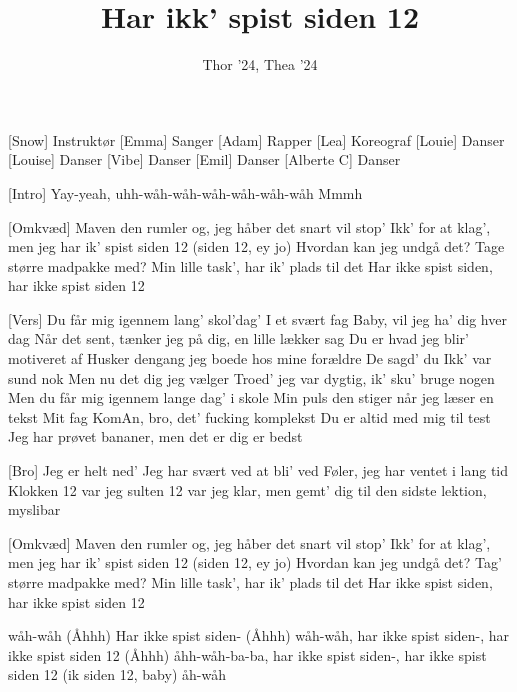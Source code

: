 \documentclass[a4paper,11pt]{article}
\title{Har ikk' spist siden 12}
\author{Thor '24, Thea '24}
\begin{document}
\maketitle

\begin{roles}
[Snow] Instruktør
[Emma] Sanger
[Adam] Rapper
[Lea] Koreograf
[Louie] Danser
[Louise] Danser
[Vibe] Danser
[Emil] Danser
[Alberte C] Danser
\end{roles}



\begin{song}
[Intro] Yay-yeah, uhh-wåh-wåh-wåh-wåh-wåh-wåh
Mmmh

[Omkvæd] Maven den rumler og, jeg håber det snart vil stop’
Ikk' for at klag’, men jeg har ik’ spist siden 12 (siden 12, ey jo)
Hvordan kan jeg undgå det?
Tage større madpakke med?
Min lille task’, har ik’ plads til det
Har ikke spist siden, har ikke spist siden 12

[Vers] Du får mig igennem lang’ skol’dag’
I et svært fag
Baby, vil jeg ha’ dig hver dag
Når det sent, tænker jeg på dig, en lille lækker sag
Du er hvad jeg blir’ motiveret af
Husker dengang jeg boede hos mine forældre
De sagd’ du Ikk' var sund nok
Men nu det dig jeg vælger
Troed’ jeg var dygtig, ik’ sku’ bruge nogen
Men du får mig igennem lange dag’ i skole
Min puls den stiger når jeg læser en tekst
Mit fag KomAn, bro, det’ fucking komplekst
Du er altid med mig til test
Jeg har prøvet bananer, men det er dig er bedst

[Bro] Jeg er helt ned’
Jeg har svært ved at bli’ ved
Føler, jeg har ventet i lang tid
Klokken 12 var jeg sulten
12 var jeg klar, men gemt’ dig til den sidste lektion, myslibar

[Omkvæd] Maven den rumler og, jeg håber det snart vil stop’
Ikk' for at klag’, men jeg har ik’ spist siden 12 (siden 12, ey jo)
Hvordan kan jeg undgå det?
Tag’ større madpakke med?
Min lille task’, har ik’ plads til det
Har ikke spist siden, har ikke spist siden 12

wåh-wåh
(Åhhh) Har ikke spist siden-
(Åhhh) wåh-wåh, har ikke spist siden-, har ikke spist siden 12
(Åhhh) åhh-wåh-ba-ba, har ikke spist siden-, har ikke spist
siden 12
(ik siden 12, baby) åh-wåh


\end{song}
\end{document}
